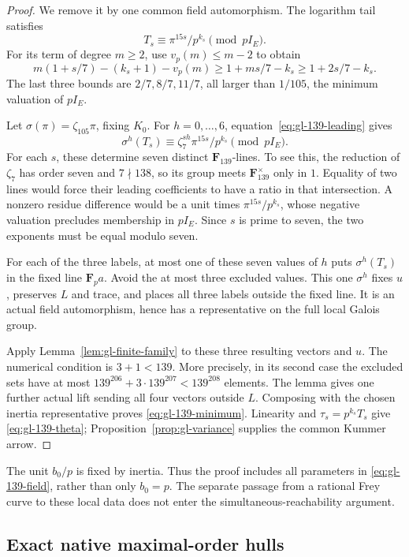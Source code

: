 \begin{proof}
We remove it by one common field automorphism. The logarithm tail
satisfies
\begin{equation}\label{eq:gl-139-leading}
 T_s\equiv\pi^{15s}/p^{k_s}\pmod{pI_E}.
\end{equation}
For its term of degree $m\ge2$, use $v_p(m)\le m-2$ to obtain
\[
 m(1+s/7)-(k_s+1)-v_p(m)
 \ge1+ms/7-k_s\ge1+2s/7-k_s.
\]
The last three bounds are $2/7,8/7,11/7$, all larger than
$1/105$, the minimum valuation of $pI_E$.

Let $\sigma(\pi)=\zeta_{105}\pi$, fixing $K_0$. For
$h=0,\ldots,6$, equation~\eqref{eq:gl-139-leading} gives
\[
 \sigma^h(T_s)\equiv
 \zeta_7^{sh}\pi^{15s}/p^{k_s}\pmod{pI_E}.
\]
For each $s$, these determine seven distinct $\mathbf F_{139}$-lines.
To see this, the reduction of $\zeta_7$ has order seven and
$7\nmid138$, so its group meets $\mathbf F_{139}^\times$ only in
$1$. Equality of two lines would force their leading coefficients
to have a ratio in that intersection. A nonzero residue difference
would be a unit times $\pi^{15s}/p^{k_s}$, whose negative valuation
precludes membership in $pI_E$. Since $s$ is prime to seven, the
two exponents must be equal modulo seven.

For each of the three labels, at most one of these seven values of
$h$ puts $\sigma^h(T_s)$ in the fixed line $\mathbf F_pa$.
Avoid the at most three excluded values. This one $\sigma^h$
fixes $u$, preserves $L$ and trace, and places all three labels
outside the fixed line. It is an actual field automorphism, hence
has a representative on the full local Galois group.

Apply Lemma~\ref{lem:gl-finite-family} to these three resulting
vectors and $u$. The numerical condition is $3+1<139$.
More precisely, in its second case the excluded sets have at most
$139^{206}+3\cdot139^{207}<139^{208}$ elements. The lemma gives
one further actual lift sending all four vectors outside $L$.
Composing with the chosen inertia representative proves
\eqref{eq:gl-139-minimum}. Linearity and $\tau_s=p^{k_s}T_s$
give \eqref{eq:gl-139-theta}; Proposition~\ref{prop:gl-variance}
supplies the common Kummer arrow.
\end{proof}

The unit $b_0/p$ is fixed by inertia. Thus the proof includes all
parameters in \eqref{eq:gl-139-field}, rather than only
$b_0=p$. The separate passage from a rational Frey curve to these
local data does not enter the simultaneous-reachability argument.

\subsection{Exact native maximal-order hulls}

